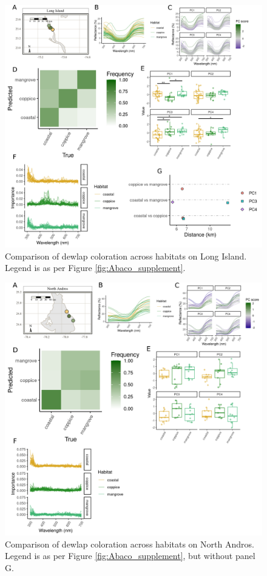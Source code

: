 \begin{figure}[H]
	\centering
	\includegraphics[width=\textwidth]{figures/LongIsland_supplement.png}
	\caption{Comparison of dewlap coloration across habitats on Long Island. Legend is as per Figure \ref{fig:Abaco_supplement}.}
	\label{fig:LongIsland}
\end{figure}

\begin{figure}[H]
	\centering
	\includegraphics[width=\textwidth]{figures/NorthAndros_supplement.png}
	\caption{Comparison of dewlap coloration across habitats on North Andros. Legend is as per Figure \ref{fig:Abaco_supplement}, but without panel G.}
	\label{fig:NorthAndros}
\end{figure}

